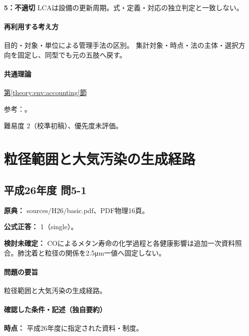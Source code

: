\noindent\textbf{5：不適切} LCAは設備の更新周期。式・定義・対応の独立判定と一致しない。\par

\paragraph{再利用する考え方} 目的・対象・単位による管理手法の区別。 集計対象・時点・法の主体・選択方向を固定し、同型でも元の五肢へ戻す。

\paragraph{共通理論} \hyperref[theory:env:accounting]{第\ref*{theory:env:accounting}節}

\par 参考：\cite{env58_accounting}。

\par 難易度 2（校準初稿）、優先度未評価。

\section{粒径範囲と大気汚染の生成経路}

\subsection{平成26年度 問5-1}
\label{q:h26-reg-basic-5-1}

\noindent\textbf{原典：} sources/H26/basic.pdf、PDF物理16頁。

\textbf{公式正答：} 1（single）。

\par\textbf{検討未確定：} COによるメタン寿命の化学過程と各健康影響は追加一次資料照合。肺沈着と粒径の関係を2.5μm一値へ固定しない。

\paragraph{問題の要旨} 粒径範囲と大気汚染の生成経路。

\paragraph{確認した条件・記述（独自要約）}\mbox{}\par

\noindent\textbf{時点：} 平成26年度に指定された資料・制度。\par

